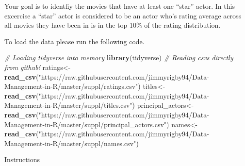 \documentclass[]{book}
\newenvironment{Shaded}{\begin{snugshade}}{\end{snugshade}}
\newcommand{\CommentTok}[1]{\textcolor[rgb]{0.56,0.35,0.01}{\textit{#1}}}
\newcommand{\KeywordTok}[1]{\textcolor[rgb]{0.13,0.29,0.53}{\textbf{#1}}}
\newcommand{\NormalTok}[1]{#1}
\newcommand{\StringTok}[1]{\textcolor[rgb]{0.31,0.60,0.02}{#1}}
\theoremstyle{definition}
\theoremstyle{definition}
\theoremstyle{definition}
\theoremstyle{remark}
\begin{document}
Your goal is to identfiy the movies that have at least one ``star'' actor. In this excercise a ``star'' actor is considered to be an actor who's rating average across all movies they have been in is in the top 10\% of the rating distribution.

To load the data please run the following code.

\begin{Shaded}
\begin{Highlighting}[]
\CommentTok{# Loading tidyverse into memory}
\KeywordTok{library}\NormalTok{(tidyverse)}
\CommentTok{# Reading csvs directly from github!}
\NormalTok{ratings<-}\KeywordTok{read_csv}\NormalTok{(}\StringTok{"https://raw.githubusercontent.com/jimmyrigby94/Data-Management-in-R/master/suppl/ratings.csv"}\NormalTok{)}
\NormalTok{titles<-}\KeywordTok{read_csv}\NormalTok{(}\StringTok{"https://raw.githubusercontent.com/jimmyrigby94/Data-Management-in-R/master/suppl/titles.csv"}\NormalTok{)}
\NormalTok{principal_actors<-}\KeywordTok{read_csv}\NormalTok{(}\StringTok{"https://raw.githubusercontent.com/jimmyrigby94/Data-Management-in-R/master/suppl/principal_actors.csv"}\NormalTok{)}
\NormalTok{names<-}\KeywordTok{read_csv}\NormalTok{(}\StringTok{"https://raw.githubusercontent.com/jimmyrigby94/Data-Management-in-R/master/suppl/names.csv"}\NormalTok{)}
\end{Highlighting}
\end{Shaded}

Instructions
\end{document}
